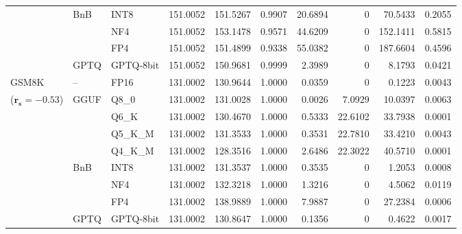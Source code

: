 \begin{table}[t]
{\begin{tabular}{ll l rrrrrrr}
 & BnB & INT8 & 151.0052 & 151.5267 & 0.9907 & 20.6894 & \cellcolor{cyan!12} $0$ & 70.5433 & 0.2055 \\
 &  & NF4 & 151.0052 & 153.1478 & 0.9571 & 44.6209 & \cellcolor{cyan!12} $0$ & 152.1411 & 0.5815 \\
 &  & FP4 & 151.0052 & 151.4899 & \cellcolor{red!18} 0.9338 & \cellcolor{red!18} 55.0382 & \cellcolor{cyan!12} $0$ & \cellcolor{red!18} 187.6604 & \cellcolor{red!18} 0.4596 \\
 & GPTQ & GPTQ-8bit & 151.0052 & 150.9681 & 0.9999 & 2.3989 & \cellcolor{cyan!12} $0$ & 8.1793 & 0.0421 \\
\midrule
GSM8K & -- & FP16 & 131.0002 & 130.9644 & 1.0000 & 0.0359 & \cellcolor{cyan!12} $0$ & 0.1223 & 0.0043 \\
{\small ($\mathbf{r_s{=}-0.53}$)} & GGUF & Q8\_0 & 131.0002 & 131.0028 & 1.0000 & 0.0026 & 7.0929 & 10.0397 & 0.0063 \\
 &  & Q6\_K & 131.0002 & 130.4670 & 1.0000 & 0.5333 & 22.6102 & 33.7938 & 0.0001 \\
 &  & Q5\_K\_M & 131.0002 & 131.3533 & 1.0000 & 0.3531 & 22.7810 & 33.4210 & 0.0043 \\
 &  & Q4\_K\_M & 131.0002 & 128.3516 & 1.0000 & 2.6486 & 22.3022 & 40.5710 & 0.0001 \\
 & BnB & INT8 & 131.0002 & 131.3537 & 1.0000 & 0.3535 & \cellcolor{cyan!12} $0$ & 1.2053 & 0.0008 \\
 &  & NF4 & 131.0002 & 132.3218 & 1.0000 & 1.3216 & \cellcolor{cyan!12} $0$ & 4.5062 & 0.0119 \\
 &  & FP4 & 131.0002 & 138.9889 & 1.0000 & 7.9887 & \cellcolor{cyan!12} $0$ & 27.2384 & 0.0006 \\
 & GPTQ & GPTQ-8bit & 131.0002 & 130.8647 & 1.0000 & 0.1356 & \cellcolor{cyan!12} $0$ & 0.4622 & 0.0017 \\
\bottomrule
\end{tabular}}
\end{table}